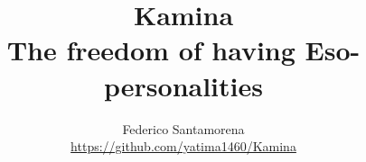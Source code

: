 \documentclass[12pt]{article}
\begin{document}
\title
{
    Kamina \\
    The freedom of having Eso-personalities \\
}
\author
{
    Federico Santamorena \\
    \href{https://github.com/yatima1460/Kamina}{https://github.com/yatima1460/Kamina} \\ 
}
\maketitle
\end{document}
